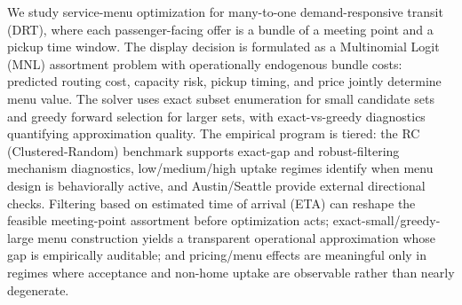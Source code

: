 We study service-menu optimization for many-to-one demand-responsive transit (DRT), where each passenger-facing offer is a bundle of a meeting point and a pickup time window. The display decision is formulated as a Multinomial Logit (MNL) assortment problem with operationally endogenous bundle costs: predicted routing cost, capacity risk, pickup timing, and price jointly determine menu value. The solver uses exact subset enumeration for small candidate sets and greedy forward selection for larger sets, with exact-vs-greedy diagnostics quantifying approximation quality. The empirical program is tiered: the RC (Clustered-Random) benchmark supports exact-gap and robust-filtering mechanism diagnostics, low/medium/high uptake regimes identify when menu design is behaviorally active, and Austin/Seattle provide external directional checks. Filtering based on estimated time of arrival (ETA) can reshape the feasible meeting-point assortment before optimization acts; exact-small/greedy-large menu construction yields a transparent operational approximation whose gap is empirically auditable; and pricing/menu effects are meaningful only in regimes where acceptance and non-home uptake are observable rather than nearly degenerate.
